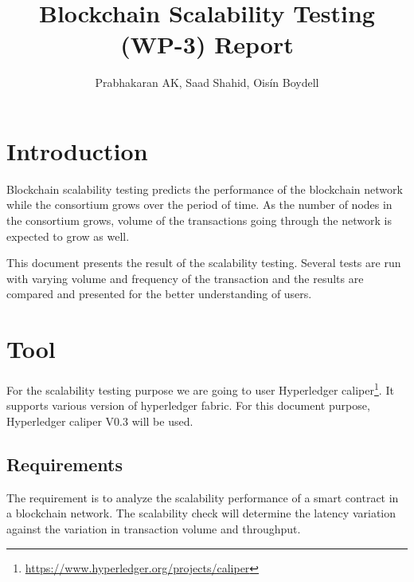 \documentclass{ceadar_article}
\begin{document}
\title{Blockchain Scalability Testing (WP-3) Report}


\author{Prabhakaran AK, Saad Shahid, Ois\'{i}n Boydell}

\maketitle

\newpage


\section{Introduction}

Blockchain scalability testing predicts the performance of the blockchain network while the consortium grows over the period of time. As the number of nodes in the consortium grows, volume of the transactions going through the network is expected to grow as well. 

This document presents the result of the scalability testing. Several tests are run with varying volume and frequency of the transaction and the results are compared and presented for the better understanding of users.
\newline

\section{Tool}
For the scalability testing purpose we are going to user Hyperledger caliper\footnote{\url{https://www.hyperledger.org/projects/caliper}}. It supports various version of hyperledger fabric. For this document purpose, Hyperledger caliper V0.3 will be used.

\subsection{Requirements}
The requirement is to analyze the scalability performance of a smart contract in a blockchain network. The scalability check will determine the latency variation against the variation in transaction volume and throughput.
\end{document}
